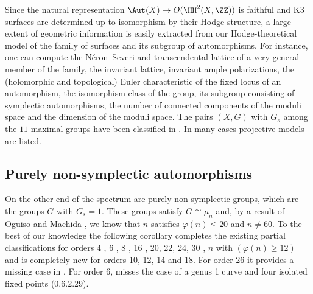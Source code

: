 Since the natural representation
$\Aut(X) \to O(\HH^2(X,\ZZ))$ is faithful and K3 surfaces are determined up to isomorphism by their Hodge structure,
a large extent of geometric information is easily extracted from our Hodge-theoretical model of the family of surfaces and its subgroup of automorphisms.
For instance, one can compute the N\'eron--Severi and transcendental lattice of a very-general member of the family, the invariant lattice, invariant ample polarizations, the (holomorphic and topological) Euler characteristic of the fixed locus of an automorphism,
the isomorphism class of the group, its subgroup consisting of symplectic automorphisms, the number of connected components of the moduli space and the dimension of the moduli space.
The pairs $(X,G)$ with $G_s$ among the $11$ maximal groups have been classified in \cite{brandhorst-hashimoto2021}. In many cases projective models are listed.

\subsection*{Purely non-symplectic automorphisms}
On the other end of the spectrum are purely non-symplectic groups, which are the groups $G$ with $G_s=1$. These groups satisfy $G \cong \mu_n$ and, by a result of Oguiso and Machida \cite{Oguiso-Machida1998},
we know that $n$ satisfies $\varphi(n) \leq 20$ and $n\neq 60$.
To the best of our knowledge the following corollary completes the existing partial classifications for orders 4 \cite{order4}, 6 \cite{order6}, 8 \cite{order8}, 16 \cite{order16}, 20, 22, 24, 30 \cite{onedim}, $n$ with $(\varphi(n)\geq 12)$ \cite{brandhorst2019} and is completely new for orders 10, 12, 14 and 18. For order 26 it provides a missing case in \cite[Thm 1.1]{brandhorst2019}.
For order $6$, \cite[Thm. 4.1]{order6} misses the case of
a genus 1 curve and four isolated fixed points (0.6.2.29).

